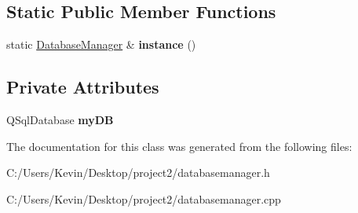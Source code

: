 \subsection*{Static Public Member Functions}
\begin{DoxyCompactItemize}
\item 
\mbox{\label{class_database_manager_a4abb527066e28f3928ef45af856e134c}} 
static \mbox{\hyperlink{class_database_manager}{Database\+Manager}} \& {\bfseries instance} ()
\end{DoxyCompactItemize}
\subsection*{Private Attributes}
\begin{DoxyCompactItemize}
\item 
\mbox{\label{class_database_manager_a794f47934ded0786f7745ebe6eac14f9}} 
Q\+Sql\+Database {\bfseries my\+DB}
\end{DoxyCompactItemize}


The documentation for this class was generated from the following files\+:\begin{DoxyCompactItemize}
\item 
C\+:/\+Users/\+Kevin/\+Desktop/project2/databasemanager.\+h\item 
C\+:/\+Users/\+Kevin/\+Desktop/project2/databasemanager.\+cpp\end{DoxyCompactItemize}
